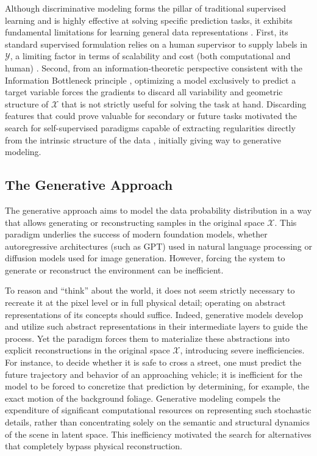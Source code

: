 \documentclass[11pt, oneside, openany]{book}
\begin{document}
Although discriminative modeling forms the pillar of traditional supervised learning \cite{goodfellow2016deep} and is highly effective at solving specific prediction tasks, it exhibits fundamental limitations for learning general data representations \cite{bengio2013representation}. First, its standard supervised formulation relies on a human supervisor to supply labels in $\mathcal{Y}$, a limiting factor in terms of scalability and cost (both computational and human) \cite{lecun2022path}. Second, from an information-theoretic perspective consistent with the Information Bottleneck principle \cite{tishby2000information}, optimizing a model exclusively to predict a target variable forces the gradients to discard all variability and geometric structure of $\mathcal{X}$ that is not strictly useful for solving the task at hand. Discarding features that could prove valuable for secondary or future tasks motivated the search for self-supervised paradigms capable of extracting regularities directly from the intrinsic structure of the data \cite{bengio2013representation}, initially giving way to generative modeling.

\subsection{The Generative Approach}
\label{sec:1.2.2}

The generative approach aims to model the data probability distribution in a way that allows generating or reconstructing samples in the original space $\mathcal{X}$. This paradigm underlies the success of modern foundation models, whether autoregressive architectures (such as GPT) used in natural language processing or diffusion models used for image generation. However, forcing the system to generate or reconstruct the environment can be inefficient.

To reason and ``think'' about the world, it does not seem strictly necessary to recreate it at the pixel level or in full physical detail; operating on abstract representations of its concepts should suffice. Indeed, generative models develop and utilize such abstract representations in their intermediate layers to guide the process. Yet the paradigm forces them to materialize these abstractions into explicit reconstructions in the original space $\mathcal{X}$, introducing severe inefficiencies. For instance, to decide whether it is safe to cross a street, one must predict the future trajectory and behavior of an approaching vehicle; it is inefficient for the model to be forced to concretize that prediction by determining, for example, the exact motion of the background foliage. Generative modeling compels the expenditure of significant computational resources on representing such stochastic details, rather than concentrating solely on the semantic and structural dynamics of the scene in latent space. This inefficiency motivated the search for alternatives that completely bypass physical reconstruction.
\end{document}
